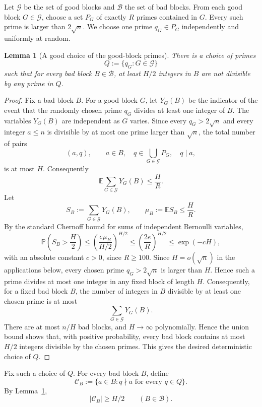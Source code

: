\documentclass[11pt,reqno]{amsart}
\numberwithin{equation}{section}
\theoremstyle{plain}
\newtheorem{lemma}[theorem]{Lemma}
\theoremstyle{definition}
\begin{document}
Let $\mathcal G$ be the set of good blocks and $\mathcal B$ the set of bad
blocks.  From each good block $G\in\mathcal G$, choose a set $P_G$ of exactly
$R$ primes contained in $G$.  Every such prime is larger than $2\sqrt n$.
We choose one prime $q_G\in P_G$ independently and uniformly at random.

\begin{lemma}[A good choice of the good-block primes]
\label{lem:choose-good-primes}
There is a choice of primes
\[
        Q:=\{q_G:G\in\mathcal G\}
\]
such that for every bad block $B\in\mathcal B$, at least $H/2$ integers in $B$
are not divisible by any prime in $Q$.
\end{lemma}

\begin{proof}
Fix a bad block $B$.  For a good block $G$, let $Y_G(B)$ be the indicator of
the event that the randomly chosen prime $q_G$ divides at least one integer of
$B$.  The variables $Y_G(B)$ are independent as $G$ varies.  Since every
$q_G>2\sqrt n$ and every integer $a\le n$ is divisible by at most one prime
larger than $\sqrt n$, the total number of pairs
\[
        (a,q),\qquad a\in B,\quad q\in\bigcup_{G\in\mathcal G}P_G,\quad q\mid a,
\]
is at most $H$.  Consequently
\[
        \mathbb E\sum_{G\in\mathcal G}Y_G(B) \le \frac{H}{R}.
\]
Let
\[
        S_B:=\sum_{G\in\mathcal G}Y_G(B),
        \qquad
        \mu_B:=\mathbb E S_B\le \frac{H}{R}.
\]
By the standard Chernoff bound for sums of independent Bernoulli variables,
\[
        \mathbb P\left(S_B>\frac H2\right)
        \le
        \left(\frac{e\mu_B}{H/2}\right)^{H/2}
        \le
        \left(\frac{2e}{R}\right)^{H/2}
        \le \exp(-cH),
\]
with an absolute constant \(c>0\), since \(R\ge100\). Since $H=o(\sqrt n)$ in the applications
below, every chosen prime $q_G>2\sqrt n$ is larger than $H$.  Hence such a prime
divides at most one integer in any fixed block of length $H$.  Consequently, for
a fixed bad block $B$, the number of integers in $B$ divisible by at least one
chosen prime is at most
\[
        \sum_{G\in\mathcal G}Y_G(B).
\]
There are at most $n/H$ bad blocks, and $H\to\infty$ polynomially.  Hence the
union bound shows that, with positive probability, every bad block contains at
most $H/2$ integers divisible by the chosen primes.  This gives the desired
deterministic choice of $Q$.
\end{proof}

Fix such a choice of $Q$.  For every bad block $B$, define
\[
        \mathcal C_B:=\{a\in B:q\nmid a\text{ for every }q\in Q\}.
\]
By Lemma~\ref{lem:choose-good-primes},
\[
        |\mathcal C_B|\ge H/2
        \qquad (B\in\mathcal B).
\]
\end{document}
